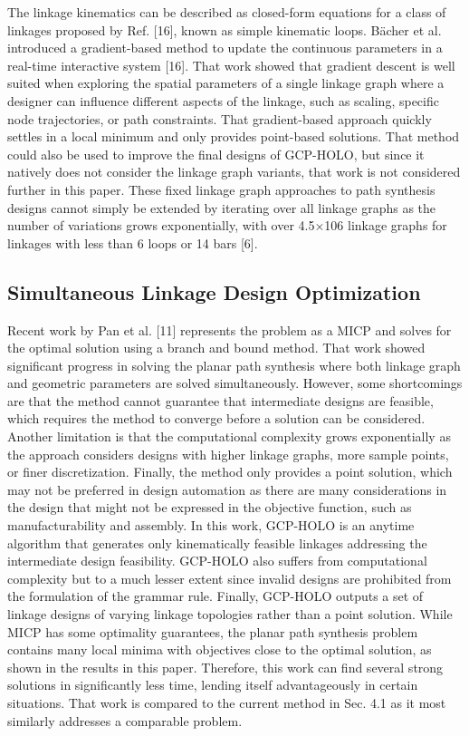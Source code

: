 The linkage kinematics can be described as closed-form equations for a class of linkages proposed by Ref. [16], known as simple kinematic loops. Bächer et al. introduced a gradient-based method to update the continuous parameters in a real-time interactive system [16]. That work showed that gradient descent is well suited when exploring the spatial parameters of a single linkage graph where a designer can influence different aspects of the linkage, such as scaling, specific node trajectories, or path constraints. That gradient-based approach quickly settles in a local minimum and only provides point-based solutions. That method could also be used to improve the final designs of GCP-HOLO, but since it natively does not consider the linkage graph variants, that work is not considered further in this paper. These fixed linkage graph approaches to path synthesis designs cannot simply be extended by iterating over all linkage graphs as the number of variations grows exponentially, with over 4.5×106 linkage graphs for linkages with less than 6 loops or 14 bars [6].

\subsection{Simultaneous Linkage Design Optimization}
Recent work by Pan et al. [11] represents the problem as a MICP and solves for the optimal solution using a branch and bound method. That work showed significant progress in solving the planar path synthesis where both linkage graph and geometric parameters are solved simultaneously. However, some shortcomings are that the method cannot guarantee that intermediate designs are feasible, which requires the method to converge before a solution can be considered. Another limitation is that the computational complexity grows exponentially as the approach considers designs with higher linkage graphs, more sample points, or finer discretization. Finally, the method only provides a point solution, which may not be preferred in design automation as there are many considerations in the design that might not be expressed in the objective function, such as manufacturability and assembly. In this work, GCP-HOLO is an anytime algorithm that generates only kinematically feasible linkages addressing the intermediate design feasibility. GCP-HOLO also suffers from computational complexity but to a much lesser extent since invalid designs are prohibited from the formulation of the grammar rule. Finally, GCP-HOLO outputs a set of linkage designs of varying linkage topologies rather than a point solution. While MICP has some optimality guarantees, the planar path synthesis problem contains many local minima with objectives close to the optimal solution, as shown in the results in this paper. Therefore, this work can find several strong solutions in significantly less time, lending itself advantageously in certain situations. That work is compared to the current method in Sec. 4.1 as it most similarly addresses a comparable problem. 

